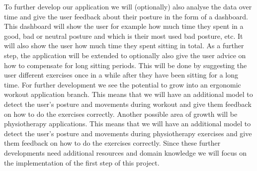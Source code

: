 To further develop our application we will (optionally) also analyse the data over time and give the user feedback about their posture 
in the form of a dashboard. This dashboard will show the user for example how much time they spent in a good, bad or neutral posture
and which is their most used bad posture, etc. It will also show the user how much time they spent sitting in total. 
As a further step, the application will be extended to optionally also give the user advice on how to compensate for long sitting periods.
This will be done by suggesting the user different exercises once in a while after they have been sitting for a long time.  
For further development we see the potential to grow into an ergonomic workout application branch. This means that
we will have an additional model to detect the user's posture and movements during workout and give them feedback on how to do the exercises correctly.
Another possible area of growth will be physiotherapy applications. 
This means that we will have an additional model to detect the user's posture and movements
during physiotherapy exercises and give them feedback on how to do the exercises correctly.
Since these further developments need additional resources and domain knowledge we will focus on the implementation
of the first step of this project. 
